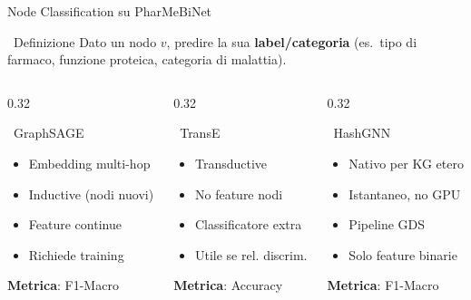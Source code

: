 \documentclass[aspectratio=169]{beamer}
\newcommand{\icoBrain}{\faBrain}
\newcommand{\icoNet}{\faNetworkWired}
\newcommand{\icoCheck}{\faCheckCircle}
\newcommand{\icoX}{\faTimesCircle}
\newcommand{\icoBrain}{\ding{108}}
\newcommand{\icoNet}{\ding{213}}
\newcommand{\icoCheck}{\ding{52}}
\newcommand{\icoX}{\ding{56}}
\newcommand{\pro}{{\color{successGreen}\icoCheck}}
\newcommand{\con}{{\color{warningRed}\icoX}}
\newcommand{\neu}{{\color{unigold}$\sim$}}
\begin{document}
\begin{frame}{Node Classification su PharMeBiNet}
  \begin{block}{\icoNet\ Definizione}
    \small
    Dato un nodo $v$, predire la sua \textbf{label/categoria}
    (es.\ tipo di farmaco, funzione proteica, categoria di malattia).
  \end{block}
  \vspace{0.1cm}
  \begin{columns}[T]
    \begin{column}{0.32\textwidth}
      \begin{block}{\color{graphsageBlue}\icoBrain\ GraphSAGE}
        \footnotesize
        \begin{itemize}
          \setlength{\itemsep}{1pt}
          \item[\pro] Embedding multi-hop
          \item[\pro] Inductive (nodi nuovi)
          \item[\pro] Feature continue
          \item[\neu] Richiede training
        \end{itemize}
        \vspace{2pt}
        {\scriptsize\textbf{Metrica}: F1-Macro}
      \end{block}
    \end{column}
    \begin{column}{0.32\textwidth}
      \begin{block}{\color{transeGreen}\icoBrain\ TransE}
        \footnotesize
        \begin{itemize}
          \setlength{\itemsep}{1pt}
          \item[\neu] Transductive
          \item[\con] No feature nodi
          \item[\neu] Classificatore extra
          \item[\neu] Utile se rel. discrim.
        \end{itemize}
        \vspace{2pt}
        {\scriptsize\textbf{Metrica}: Accuracy}
      \end{block}
    \end{column}
    \begin{column}{0.32\textwidth}
      \begin{block}{\color{hashgnnPurple}\icoBrain\ HashGNN}
        \footnotesize
        \begin{itemize}
          \setlength{\itemsep}{1pt}
          \item[\pro] Nativo per KG etero
          \item[\pro] Istantaneo, no GPU
          \item[\pro] Pipeline GDS
          \item[\con] Solo feature binarie
        \end{itemize}
        \vspace{2pt}
        {\scriptsize\textbf{Metrica}: F1-Macro}
      \end{block}
    \end{column}
  \end{columns}
\end{frame}
\end{document}
